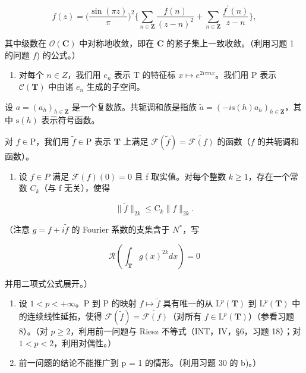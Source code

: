 \[
f (z) = \Big (\frac {\sin (\pi z)}{\pi} \Big) ^ {2} \Big \{\sum_ {n \in \mathbf {Z}} \frac {f (n)}{(z - n) ^ {2}} + \sum_ {n \in \mathbf {Z}} \frac {f ^ {\prime} (n)}{z - n} \Big \},
\]

其中级数在 \(\mathcal{O}(\mathbf{C})\) 中对称地收敛，即在 \(\mathbf{C}\) 的紧子集上一致收敛。（利用习题 1 的问题 \(f\)) 的公式。）

\begin{enumerate}
\def\labelenumi{\arabic{enumi})}
\setcounter{enumi}{37}
\tightlist
\item
  对每个 \(n \in Z\)，我们用 \(e_{n}\) 表示 T 的特征标 \(x \mapsto e^{2i\pi nx}\)。我们用 P 表示 \(\mathcal{C}(\mathbf{T})\) 中由诸 \(e_{n}\) 生成的子空间。
\end{enumerate}

  设 \(a = (a_h)_{h \in \mathbf{Z}}\) 是一个复数族。共轭调和族是指族 \(\widetilde{a} = (-i\mathrm{s}(h)a_h)_{h \in \mathbf{Z}}\)，其中 \(\mathrm{s}(h)\) 表示符号函数。

  对 \(f \in \mathrm{P}\)，我们用 \(\widetilde{f} \in \mathrm{P}\) 表示 \(\mathbf{T}\) 上满足 \(\mathcal{F}(\widetilde{f}) = \widetilde{\mathcal{F}(f)}\) 的函数（\(f\) 的共轭调和函数）。

\begin{enumerate}
\def\labelenumi{\alph{enumi})}
\tightlist
\item
  设 \(f \in P\) 满足 \(\mathcal{F}(f)(0) = 0\) 且 f 取实值。对每个整数 \(k \geqslant 1\)，存在一个常数 \(C_k\)（与 f 无关），使得
\end{enumerate}

\[
\| \widetilde {f} \| _ {2 k} \leqslant \mathrm{C} _ {k} \| f \| _ {2 k}.
\]

  （注意 \(g = f + i\tilde{f}\) 的 Fourier 系数的支集含于 \(N^{*}\)，写

\[
\mathcal {R} \left(\int_ {\mathbf {T}} g (x) ^ {2 k} d x\right) = 0
\]

并用二项式公式展开。）

\begin{enumerate}
\def\labelenumi{\alph{enumi})}
\setcounter{enumi}{1}
\item
  设 \(1 < p < +\infty\)。P 到 P 的映射 \(f \mapsto \widetilde{f}\) 具有唯一的从 \(\mathrm{L}^p(\mathbf{T})\) 到 \(\mathrm{L}^p(\mathbf{T})\) 中的连续线性延拓，使得 \(\mathcal{F}(\widetilde{f}) = \widetilde{\mathcal{F}(f)}\)（对所有 \(f \in \mathrm{L}^p(\mathbf{T})\)）（参看习题 8）。（对 \(p \geqslant 2\)，利用前一问题与 Riesz 不等式（INT，IV，§6，习题 18）；对 \(1 < p < 2\)，利用对偶性。）
\item
  前一问题的结论不能推广到 p = 1 的情形。（利用习题 30 的 b)。）
\end{enumerate}

